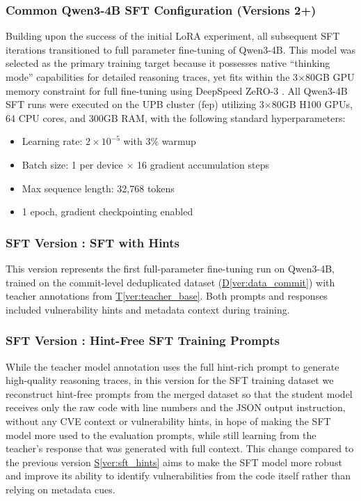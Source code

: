 \documentclass[12pt,a4paper]{article}
\makeatletter
\newcounter{SFTVer}
\newcommand{\sftversion}[2]{%
  \stepcounter{SFTVer}%
  \subsubsection{SFT Version \theSFTVer: #1}%
  \protected@edef\@currentlabel{\theSFTVer}\label{#2}%
}
\makeatother
\begin{document}
\subsubsection{Common Qwen3-4B SFT Configuration (Versions 2+)}
Building upon the success of the initial LoRA experiment, all subsequent SFT iterations transitioned to full parameter fine-tuning of Qwen3-4B. This model was selected as the primary training target because it possesses native ``thinking mode'' capabilities for detailed reasoning traces, yet fits within the 3$\times$80GB GPU memory constraint for full fine-tuning using DeepSpeed ZeRO-3 \cite{deepspeed}. All Qwen3-4B SFT runs were executed on the UPB cluster (fep) utilizing 3$\times$80GB H100 GPUs, 64 CPU cores, and 300GB RAM, with the following standard hyperparameters:
\begin{itemize}
  \item Learning rate: $2 \times 10^{-5}$ with 3\% warmup
  \item Batch size: 1 per device $\times$ 16 gradient accumulation steps
  \item Max sequence length: 32,768 tokens
  \item 1 epoch, gradient checkpointing enabled
\end{itemize}

\sftversion{SFT with Hints}{ver:sft_hints}
This version represents the first full-parameter fine-tuning run on Qwen3-4B, trained on the commit-level deduplicated dataset (\hyperref[ver:data_commit]{D\ref*{ver:data_commit}}) with teacher annotations from \hyperref[ver:teacher_base]{T\ref*{ver:teacher_base}}. Both prompts and responses included vulnerability hints and metadata context during training.

\sftversion{Hint-Free SFT Training Prompts}{ver:sft_hintfree}

While the teacher model annotation uses the full hint-rich prompt to generate high-quality reasoning traces, in this version for the SFT training dataset we reconstruct hint-free prompts from the merged dataset so that the student model receives only the raw code with line numbers and the JSON output instruction, without any CVE context or vulnerability hints, in hope of making the SFT model more used to the evaluation prompts, while still learning from the teacher's response that was generated with full context. This change compared to the previous version \hyperref[ver:sft_hints]{S\ref*{ver:sft_hints}} aims to make the SFT model more robust and improve its ability to identify vulnerabilities from the code itself rather than relying on metadata cues.
\end{document}
